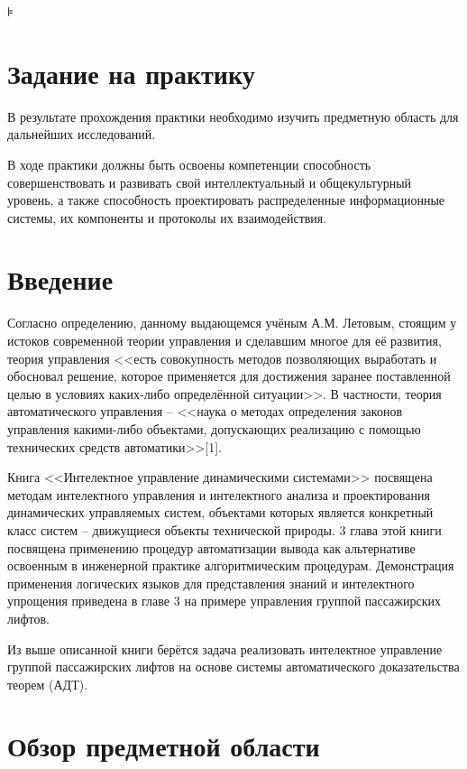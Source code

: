 
\usepackage{hyperref,xcolor}




\setcounter{page}{2}
\tableofcontents⊧

\newpage
\section{Задание на практику }
В результате прохождения практики необходимо изучить предметную область для дальнейших исследований.

В ходе практики должны быть освоены компетенции способность совершенствовать и развивать свой интеллектуальный и общекультурный уровень, а также способность проектировать распределенные информационные системы, их компоненты и протоколы их взаимодействия.

\newpage
\section{Введение}

Согласно  определению, данному выдающемся учёным А.М. Летовым, стоящим у истоков современной теории управления и сделавшим многое для её развития, теория управления <<есть совокупность методов позволяющих выработать и обосновал решение, которое применяется для достижения заранее поставленной целью в условиях каких-либо определённой ситуации>>. В частности, теория автоматического управления -- <<наука о методах  определения законов управления какими-либо объектами, допускающих реализацию с помощью технических средств автоматики>>[1].

    Книга <<Интелектное управление динамическими системами>> посвящена методам интелектного управления и интелектного анализа и проектирования динамических управляемых систем, объектами которых является конкретный класс систем -- движущиеся объекты технической природы. 3 глава этой книги посвящена применению процедур автоматизации вывода как альтернативе освоенным в инженерной практике алгоритмическим процедурам. Демонстрация применения логических языков для представления знаний и интелектного упрощения приведена в главе 3 на примере управления группой пассажирских лифтов. 

    Из выше описанной книги берётся задача реализовать интелектное управление группой пассажирских лифтов на основе системы автоматического доказательства теорем (АДТ).

\newpage
{}\section{ Обзор предметной области}

